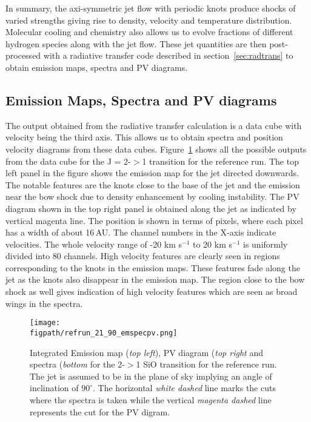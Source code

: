 \documentclass[useAMS,usenatbib,letters]{mn2e}
\newcommand{\figpath}{PFIGS/}
\begin{document}
In summary, the axi-symmetric jet flow with periodic knots 
produce shocks of varied strengths giving rise to density, velocity and
temperature distribution. Molecular cooling and chemistry also 
allows us to evolve fractions of different hydrogen species along with the jet
flow. These jet quantities are then post-processed with a radiative
transfer code described in section~\ref{sec:radtrans} to obtain emission maps,
spectra and PV diagrams.



\subsection{Emission Maps, Spectra and PV diagrams}
\label{ssec:emspecpv}
The output obtained from the radiative transfer calculation is a data
cube with velocity being the third axis. This allows us to obtain
spectra and position velocity diagrams from these data cubes. 
Figure~\ref{empvspec90} shows all the possible outputs from the data
cube for the J = 2-$>$1 transition for the reference run. 
The top left panel in the figure shows the emission map for the jet
directed downwards. The notable features are the knots close to the
base of the jet and the emission near the bow shock due to density
enhancement by cooling instability. The PV diagram shown in the top
right panel is obtained along the jet as indicated by vertical magenta
line. The position is shown in terms of pixels, where each pixel has a
width of about 16\,AU. The channel numbers in the X-axis indicate
velocities. The whole velocity range of -20 km s$^{-1}$ to 20 km
s$^{-1}$ is uniformly divided into 80 channels. High velocity features
are clearly seen in regions corresponding to the knots in the emission
maps. These features fade along the jet as the knots also disappear in
the emission map. The region close to the bow shock as well gives
indication of high velocity features which are seen as broad wings in
the spectra. 
%

\begin{figure}
 \texttt{[image: \\figpath/refrun\_21\_90\_emspecpv.png]}
 \caption{Integrated Emission map ({\it top left}), PV diagram ({\it top right}
   and spectra ({\it bottom} for the
   2-$>$1 SiO transition for the reference run. 
   The jet is assumed to be in the plane of sky implying an angle of
   inclination of $90^{\circ}$. The horizontal
 {\it white dashed} line marks the cuts where the spectra is taken
 while the vertical {\it magenta dashed} line represents the cut for
 the PV digram.} 
\label{empvspec90}
\end{figure}
\end{document}
